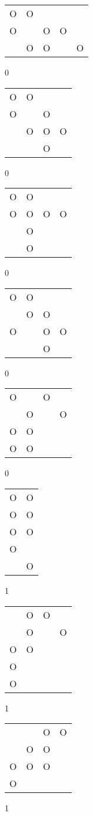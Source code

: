 \begin{tabular}{|m{0.2cm}m{0.2cm}m{0.2cm}m{0.2cm}m{0.2cm}|}\hline
O&O& & & \\
O& &O&O& \\
 &O&O& &O\\
\hline\end{tabular}0
\begin{tabular}{|m{0.2cm}m{0.2cm}m{0.2cm}m{0.2cm}|}\hline
O&O& & \\
O& &O& \\
 &O&O&O\\
 & &O& \\
\hline\end{tabular}0
\begin{tabular}{|m{0.2cm}m{0.2cm}m{0.2cm}m{0.2cm}|}\hline
O&O& & \\
O&O&O&O\\
 &O& & \\
 &O& & \\
\hline\end{tabular}0
\begin{tabular}{|m{0.2cm}m{0.2cm}m{0.2cm}m{0.2cm}|}\hline
O&O& & \\
 &O&O& \\
O& &O&O\\
 & &O& \\
\hline\end{tabular}0
\begin{tabular}{|m{0.2cm}m{0.2cm}m{0.2cm}m{0.2cm}|}\hline
O& &O& \\
 &O& &O\\
O&O& & \\
O&O& & \\
\hline\end{tabular}0
\begin{tabular}{|m{0.2cm}m{0.2cm}|}\hline
O&O\\
O&O\\
O&O\\
O& \\
 &O\\
\hline\end{tabular}1
\begin{tabular}{|m{0.2cm}m{0.2cm}m{0.2cm}m{0.2cm}|}\hline
 &O&O& \\
 &O& &O\\
O&O& & \\
O& & & \\
O& & & \\
\hline\end{tabular}1
\begin{tabular}{|m{0.2cm}m{0.2cm}m{0.2cm}m{0.2cm}|}\hline
 & &O&O\\
 &O&O& \\
O&O&O& \\
O& & & \\
\hline\end{tabular}1
